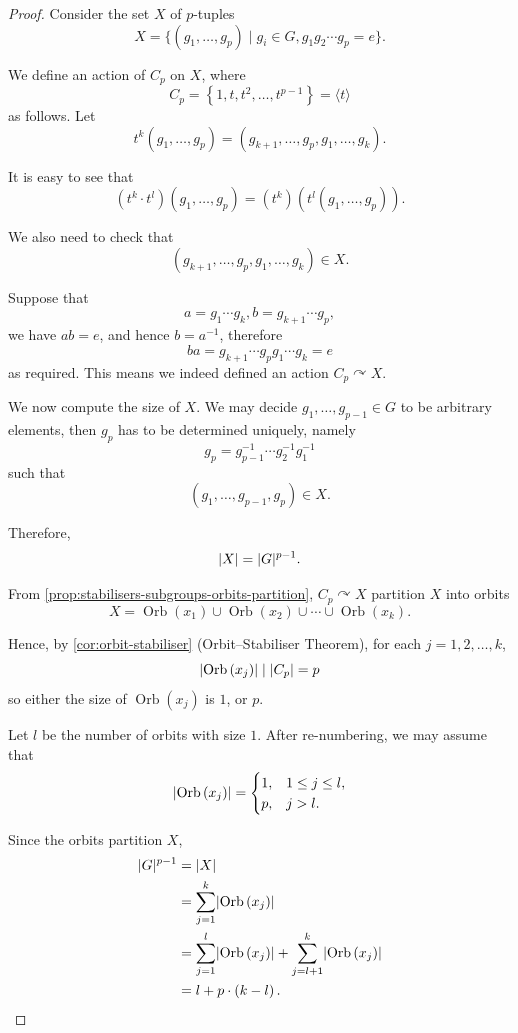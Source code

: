 \documentclass{article}
\theoremstyle{definition}
\theoremstyle{remark}
\DeclarePairedDelimiter{\abs}{\lvert}{\rvert}
\newcommand{\pqty}[1]{\left(#1\right)}
\newcommand{\Bqty}[1]{\left\{#1\right\}}
\newcommand{\angBrac}[1]{\langle #1\rangle}
\newcommand{\set}[2]{\{#1\mid #2\}}
\newcommand{\inverse}{^{-1}}
\newcommand{\actson}{\curvearrowright}
\newcommand{\divides}{\mid}
\newcommand{\Orb}{\operatorname{Orb}}
\begin{document}
\begin{proof}
    Consider the set \(X\) of \(p\)-tuples
    \[
        X = \set{\pqty{g_1, \ldots, g_p}}{g_i \in G, g_1 g_2 \cdots g_p = e}.
    \]

    We define an action of \(C_p\) on \(X\), where
    \[
        C_p = \Bqty{1, t, t^2, \ldots, t^{p - 1}} = \angBrac{t}
    \]
    as follows. Let
    \[
        t^k \pqty{g_1, \ldots, g_p} = \pqty{g_{k + 1}, \ldots, g_p, g_1, \ldots, g_k}.
    \]

    It is easy to see that
    \[
        \pqty{t^k \cdot t^l} \pqty{g_1, \ldots, g_p} = \pqty{t^k} \pqty{t^l \pqty{g_1, \ldots, g_p}}.
    \]

    We also need to check that
    \[
        \pqty{g_{k + 1}, \ldots, g_p, g_1, \ldots, g_k} \in X.
    \]

    Suppose that
    \[
        a = g_1 \cdots g_k, b = g_{k + 1} \cdots g_p,
    \]
    we have \(ab = e\), and hence \(b = a\inverse\), therefore
    \[
        ba = g_{k + 1} \cdots g_p g_1 \cdots g_k = e
    \]
    as required. This means we indeed defined an action \(C_p \actson X\).

    We now compute the size of \(X\). We may decide \(g_1, \ldots, g_{p - 1} \in G\) to be arbitrary elements, then \(g_p\) has to be determined uniquely, namely
    \[
        g_p = g_{p - 1}\inverse \cdots g_2\inverse g_1\inverse
    \]
    such that
    \[
        \pqty{g_1, \ldots, g_{p - 1}, g_p} \in X.
    \]

    Therefore,
    \[
        \abs{X} = \abs{G}^{p - 1}.
    \]

    From \autoref{prop:stabilisers-subgroups-orbits-partition}, \(C_p \actson X\) partition \(X\) into orbits
    \[
        X = \Orb\pqty{x_1} \cup \Orb\pqty{x_2} \cup \cdots \cup \Orb\pqty{x_k}.
    \]

    Hence, by \autoref{cor:orbit-stabiliser} (Orbit--Stabiliser Theorem), for each \(j = 1, 2, \ldots, k\),
    \[
        \abs{\Orb\pqty{x_j}} \divides \abs{C_p} = p
    \]
    so either the size of \(\Orb\pqty{x_j}\) is \(1\), or \(p\).

    Let \(l\) be the number of orbits with size \(1\). After re-numbering, we may assume that
    \[
        \abs{\Orb\pqty{x_j}} = \begin{cases}
            1, & 1 \leq j \leq l, \\
            p, & j > l.
        \end{cases}
    \]

    Since the orbits partition \(X\),
    \begin{align*}
        \abs{G}^{p - 1} &= \abs{X} \\
        &= \sum_{j = 1}^{k} \abs{\Orb\pqty{x_j}} \\
        &= \sum_{j = 1}^{l} \abs{\Orb{\pqty{x_j}}} + \sum_{j = l + 1}^{k} \abs{\Orb{\pqty{x_j}}} \\
        &= l + p \cdot \pqty{k - l}.
    \end{align*}


\end{proof}
\end{document}
